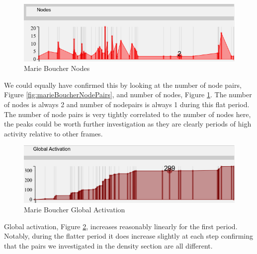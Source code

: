 \begin{figure}[H]
  \begin{center}
  \includegraphics[trim={0 0 0 0}, width=140mm]{./Figures/marieBoucherNodes.png}
  \caption{Marie Boucher Nodes}
  \label{fig:marieBoucherNodes}
  \end{center}
\end{figure}

We could equally have confirmed this by looking at the number of node pairs, Figure \ref{fig:marieBoucherNodePairs}, and number of nodes, Figure \ref{fig:marieBoucherNodes}. The number of nodes is always 2 and number of nodepairs is always 1 during this flat period. The number of node pairs is very tightly correlated to the number of nodes here, the peaks could be worth further investigation as they are clearly periods of high activity relative to other frames.

\begin{figure}[h!]
  \begin{center}
  \includegraphics[trim={0 0 0 0}, width=140mm]{./Figures/marieBoucherGlobalActivation.png}
  \caption{Marie Boucher Global Activation}
  \label{fig:marieBoucherGlobalActivation}
  \end{center}
\end{figure}
Global activation, Figure \ref{fig:marieBoucherGlobalActivation}, increases reasonably linearly for the first period. Notably, during the flatter period it does increase slightly at each step confirming that the pairs we investigated in the density section are all different. 

